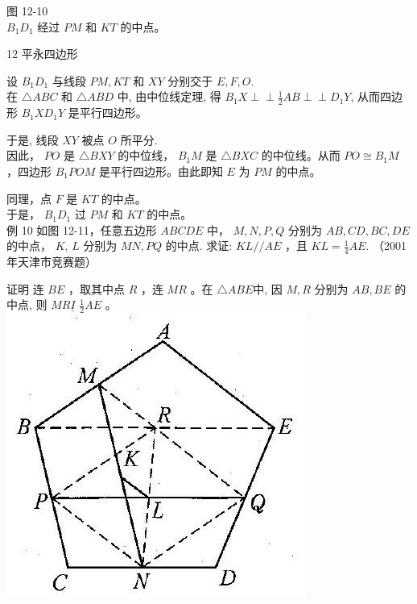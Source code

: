 \documentclass[10pt]{article}
\def\Perp{\perp\!\!\!\perp}
\begin{document}
图 12-10\\
$B_{1} D_{1}$ 经过 $P M$ 和 $K T$ 的中点。

12 平永四边形

设 $B_{1} D_{1}$ 与线段 $P M, K T$ 和 $X Y$ 分别交于 $E, F, O$.\\
在 $\triangle A B C$ 和 $\triangle A B D$ 中, 由中位线定理, 得 $B_{1} X \Perp \frac{1}{2} A B \Perp D_{1} Y$, 从而四边形 $B_{1} X D_{1} Y$ 是平行四边形。

于是, 线段 $X Y$ 被点 $O$ 所平分.\\
因此， $P O$ 是 $\triangle B X Y$ 的中位线， $B_{1} M$ 是 $\triangle B X C$ 的中位线。从而 $P O \cong B_{1} M$ ，四边形 $B_{1} P O M$ 是平行四边形。由此即知 $E$ 为 $P M$ 的中点。

同理，点 $F$ 是 $K T$ 的中点。\\
于是， $B_{1} D_{1}$ 过 $P M$ 和 $K T$ 的中点。\\
例 10 如图 12-11，任意五边形 $A B C D E$ 中， $M, N, P, Q$ 分别为 $A B, C D, B C, D E$ 的中点， $K$, $L$ 分别为 $M N, P Q$ 的中点. 求证: $K L / / A E$ ，且 $K L=\frac{1}{4} A E$. （2001 年天津市竞赛题）

证明 连 $B E$ ，取其中点 $R$ ，连 $M R$ 。在 $\triangle A B E$中, 因 $M, R$ 分别为 $A B, B E$ 的中点, 则 $M R \underline{I}$ $\frac{1}{2} A E$ 。\\
\includegraphics[max width=\textwidth, center]{2024_10_30_2c8f45efd4a519b08e1ag-116(2)}
\end{document}
